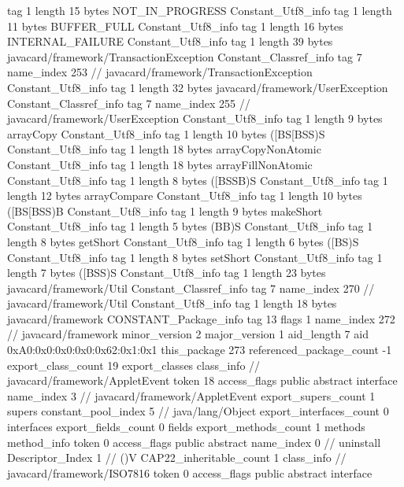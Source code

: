 {{{			tag	1
			length	15
			bytes	NOT_IN_PROGRESS
		}
		Constant_Utf8_info {
			tag	1
			length	11
			bytes	BUFFER_FULL
		}
		Constant_Utf8_info {
			tag	1
			length	16
			bytes	INTERNAL_FAILURE
		}
		Constant_Utf8_info {
			tag	1
			length	39
			bytes	javacard/framework/TransactionException
		}
		Constant_Classref_info {
			tag	7
			name_index	253		// javacard/framework/TransactionException
		}
		Constant_Utf8_info {
			tag	1
			length	32
			bytes	javacard/framework/UserException
		}
		Constant_Classref_info {
			tag	7
			name_index	255		// javacard/framework/UserException
		}
		Constant_Utf8_info {
			tag	1
			length	9
			bytes	arrayCopy
		}
		Constant_Utf8_info {
			tag	1
			length	10
			bytes	([BS[BSS)S
		}
		Constant_Utf8_info {
			tag	1
			length	18
			bytes	arrayCopyNonAtomic
		}
		Constant_Utf8_info {
			tag	1
			length	18
			bytes	arrayFillNonAtomic
		}
		Constant_Utf8_info {
			tag	1
			length	8
			bytes	([BSSB)S
		}
		Constant_Utf8_info {
			tag	1
			length	12
			bytes	arrayCompare
		}
		Constant_Utf8_info {
			tag	1
			length	10
			bytes	([BS[BSS)B
		}
		Constant_Utf8_info {
			tag	1
			length	9
			bytes	makeShort
		}
		Constant_Utf8_info {
			tag	1
			length	5
			bytes	(BB)S
		}
		Constant_Utf8_info {
			tag	1
			length	8
			bytes	getShort
		}
		Constant_Utf8_info {
			tag	1
			length	6
			bytes	([BS)S
		}
		Constant_Utf8_info {
			tag	1
			length	8
			bytes	setShort
		}
		Constant_Utf8_info {
			tag	1
			length	7
			bytes	([BSS)S
		}
		Constant_Utf8_info {
			tag	1
			length	23
			bytes	javacard/framework/Util
		}
		Constant_Classref_info {
			tag	7
			name_index	270		// javacard/framework/Util
		}
		Constant_Utf8_info {
			tag	1
			length	18
			bytes	javacard/framework
		}
		CONSTANT_Package_info {
			tag	13
			flags	1
			name_index	272		// javacard/framework
			minor_version	2
			major_version	1
			aid_length	7
			aid	0xA0:0x0:0x0:0x0:0x62:0x1:0x1
		}
	}
	this_package	273
	referenced_package_count	-1
	export_class_count	19
	export_classes {
		class_info {		// javacard/framework/AppletEvent
			token	18
			access_flags	public abstract interface
			name_index	3		// javacard/framework/AppletEvent
			export_supers_count	1
			supers {
				constant_pool_index	5		// java/lang/Object
			}
			export_interfaces_count	0
			interfaces {
			}
			export_fields_count	0
			fields {
			}
			export_methods_count	1
			methods {
				method_info {
					token	0
					access_flags	public abstract
					name_index	0		// uninstall
					Descriptor_Index	1		// ()V
				}
			}
			CAP22_inheritable_count	1
		}
		class_info {		// javacard/framework/ISO7816
			token	0
			access_flags	public abstract interface
}}}
